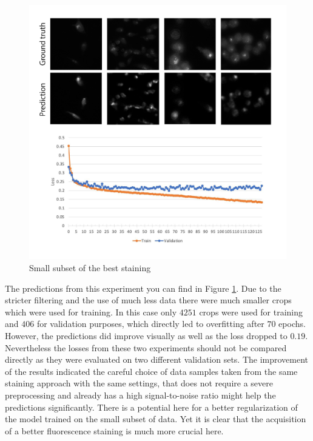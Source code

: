 \begin{figure}[htb]
	\begin{center}
		\includegraphics[width=\linewidth]{bilder/golgi/12-13/12-13.png}
		\caption{Small subset of the best staining}\label{fig:12-13}
	\end{center}
\end{figure}

The predictions from this experiment you can find in Figure \ref{fig:12-13}. Due to the stricter filtering and the use of much less data there were much smaller crops which were used for training. In this case only $4251$ crops were used for training and $406$ for validation purposes, which directly led to overfitting after $70$ epochs. However, the predictions did improve visually as well as the loss dropped to $0.19$. Nevertheless the losses from these two experiments should not be compared directly as they were evaluated on two different validation sets. The improvement of the results indicated the careful choice of data samples taken from the same staining approach with the same settings, that does not require a severe preprocessing and already has a high signal-to-noise ratio might help the predictions significantly. There is a potential here for a better regularization of the model trained on the small subset of data. Yet it is clear that the acquisition of a better fluorescence staining is much more crucial here.
